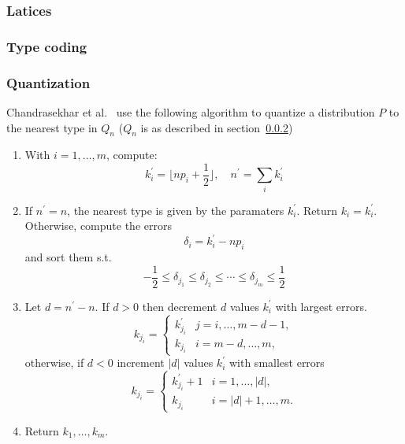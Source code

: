 \subsubsection{Latices}

\subsubsection{Type coding}
\label{sec:type_coding}

\subsubsection{Quantization}

Chandrasekhar et al.\ \cite{chog2011} use the following algorithm to quantize a distribution $P$ to the nearest type in $Q_n$ ($Q_n$ is as described in section~\ref{sec:type_coding})
\begin{enumerate}

\item With $i=1,\ldots,m$, compute: \begin{displaymath}
k_i^\prime = \lfloor np_i+\frac{1}{2} \rfloor,\quad n^\prime=\sum_i k_i^\prime
\end{displaymath}

\item \label{algo:step_sort} If $n^\prime = n$, the nearest type is given by the paramaters $k_i^\prime$. Return $k_i = k_i^\prime$. Otherwise, compute the errors
\begin{displaymath}
\delta_i = k_i^\prime - np_i
\end{displaymath}
 and sort them s.t.
\begin{displaymath}
-\frac{1}{2} \leq \delta_{j_1} \leq \delta_{j_2} \leq \cdots \leq \delta_{j_m} \leq \frac{1}{2}
\end{displaymath}

\item \label{algo:step_decrincr} Let $d = n^\prime - n$. If $d > 0$ then decrement $d$ values $k_i^\prime$ with largest errors.
\[
k_{j_i} = \begin{cases}
k_{j_i}^\prime & j = i,\ldots,m-d-1, \\
k_{j_i} & i=m-d,\ldots,m,
\end{cases}
\]
otherwise, if $d < 0$ increment $\left|d\right|$ values $k_i^\prime$ with smallest errors
\[
k_{j_i} = \begin{cases}
k_{j_i}^\prime + 1 & i = 1,\ldots,\left|d\right|, \\
k_{j_i} & i=\left|d\right|+1,\ldots,m.
\end{cases}
\]

\item Return $k_1,\ldots,k_m$.
\end{enumerate}

